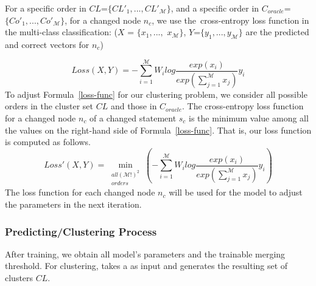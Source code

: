 For a specific order in $CL$=$\{CL'_1,..., CL'_{\mathcal{M}}\}$, and a
specific order in $C_{oracle}$=$\{Co'_{1},..., Co'_{\mathcal{M}}\}$,
for a changed node $n_c$, we use the~cross-entropy loss function in
the multi-class classification: ($X$ = $\{x_1,...,$ $x_{\mathcal{M}}\}$, $Y$=$\{y_1,...,y_{\mathcal{M}}\}$ are the predicted and correct
vectors for $n_c$)

\begin{equation}\label{loss-func}
	Loss(X,Y) = -\sum^{\mathcal{M}}_{i=1}W_ilog\frac{exp(x_i)}{exp(\sum^{\mathcal{M}}_{j=1}x_j)}y_i
\end{equation}
To adjust Formula~\ref{loss-func} for our clustering problem, we
consider all possible orders in the cluster set $CL$ and those in
$C_{oracle}$. The cross-entropy loss function for a changed node $n_c$
of a changed statement $s_c$ is the minimum value among all the values
on the right-hand side of Formula~\ref{loss-func}. That is, our loss function
is computed as follows.
\begin{equation}\label{eq6}
	Loss'(X, Y)= \min\limits_{\substack{all (\mathcal{M}!)^{2}\\orders}}(-\sum^{\mathcal{M}}_{i=1}W_ilog\frac{exp(x_i)}{exp(\sum^{\mathcal{M}}_{j=1}x_j)}y_i)
\end{equation}
The loss function for each changed node $n_c$ will be used for
the model to adjust the parameters in the next iteration.


\subsubsection{\bf Predicting/Clustering Process}
After training, we obtain all model's parameters and the trainable
merging threshold. For clustering, {\tool} takes a {\mvpdg} as input
and generates the resulting set of clusters $CL$.
